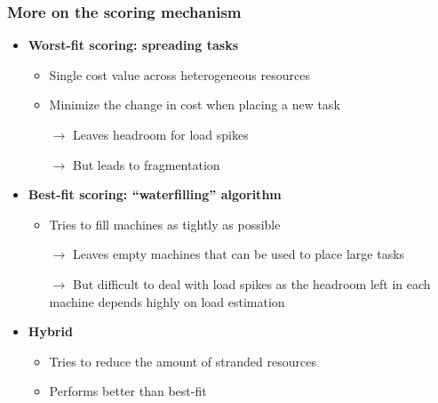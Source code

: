 \begin{frame}
\frametitle{More on the scoring mechanism}
\begin{itemize}
	\item {\bf Worst-fit scoring: spreading tasks}
	\begin{itemize}
		\item Single cost value across heterogeneous resources
		\item Minimize the change in cost when placing a new task
		\item[$\to$] Leaves headroom for load spikes
		\item[$\to$] But leads to fragmentation
	\end{itemize}

\vspace{20pt}

	\item {\bf Best-fit scoring: ``waterfilling'' algorithm}
	\begin{itemize}
		\item Tries to fill machines as tightly as possible
		\item[$\to$] Leaves empty machines that can be used to place large tasks
		\item[$\to$] But difficult to deal with load spikes as the headroom left in each machine depends highly on load estimation
	\end{itemize}

\vspace{20pt}

	\item {\bf Hybrid}
	\begin{itemize}
		\item Tries to reduce the amount of stranded resources
		\item Performs better than best-fit
	\end{itemize}
\end{itemize}
\end{frame}

